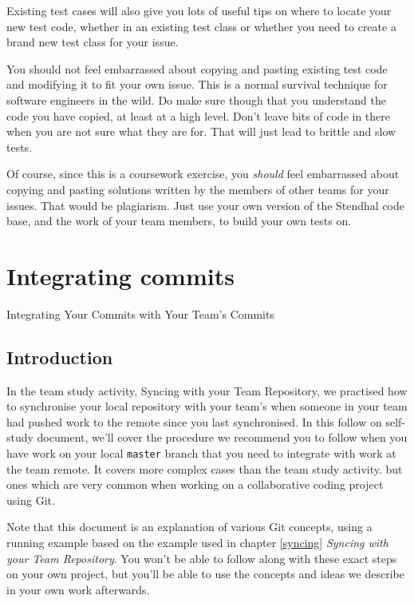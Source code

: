 \documentclass[
]{book}
\begin{document}
Existing test cases will also give you lots of useful tips on where to locate your new test code, whether in an existing test class or whether you need to create a brand new test class for your issue.

You should not feel embarrassed about copying and pasting existing test code and modifying it to fit your own issue. This is a normal survival technique for software engineers in the wild. Do make sure though that you understand the code you have copied, at least at a high level. Don't leave bits of code in there when you are not sure what they are for. That will just lead to brittle and slow tests.

Of course, since this is a coursework exercise, you \emph{should} feel embarrassed about copying and pasting solutions written by the members of other teams for your issues. That would be plagiarism. Just use your own version of the Stendhal code base, and the work of your team members, to build your own tests on.

\hypertarget{committing}{%
\chapter{Integrating commits}\label{committing}}

Integrating Your Commits with Your Team's Commits

\hypertarget{commintro}{%
\section{Introduction}\label{commintro}}

In the team study activity, Syncing with your Team Repository, we practised how to synchronise your local repository with your team's when someone in your team had pushed work to the remote since you last synchronised. In this follow on self-study document, we'll cover the procedure we recommend you to follow when you have work on your local \texttt{master} branch that you need to integrate with work at the team remote. It covers more complex cases than the team study activity. but ones which are very common when working on a collaborative coding project using Git.

Note that this document is an explanation of various Git concepts, using a running example based on the example used in chapter \ref{syncing} \emph{Syncing with your Team Repository}. You won't be able to follow along with these exact steps on your own project, but you'll be able to use the concepts and ideas we describe in your own work afterwards.
\end{document}
